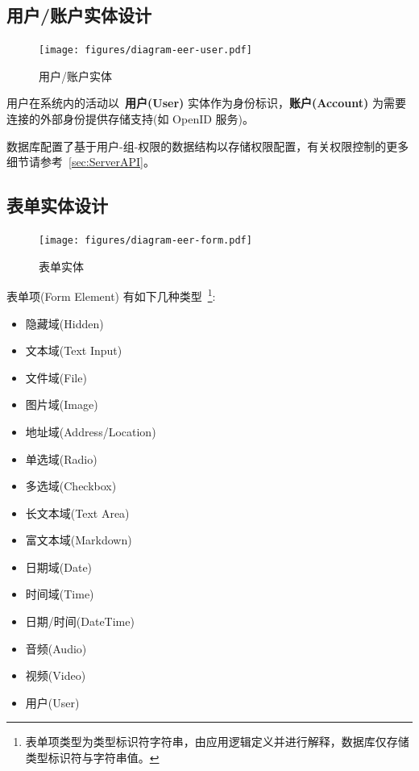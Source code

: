 \newpage

\subsection{用户/账户实体设计}

\begin{figure}[!h]
  \begin{center}
    \texttt{[image: figures/diagram-eer-user.pdf]}
    \caption{用户/账户实体\label{DatabaseEntityUser}}
  \end{center}
\end{figure}

用户在系统内的活动以~\textbf{用户(User)} 实体作为身份标识，\textbf{账户(Account)} 为需要连接的外部身份提供存储支持(如 OpenID 服务)。

数据库配置了基于用户-组-权限的数据结构以存储权限配置，有关权限控制的更多细节请参考~\ref{sec:ServerAPI}。

\newpage

\subsection{表单实体设计}

\begin{figure}[!h]
  \begin{center}
    \texttt{[image: figures/diagram-eer-form.pdf]}
    \caption{表单实体\label{DatabaseEntityForm}}
  \end{center}
\end{figure}

表单项(Form Element) 有如下几种类型~\footnote{表单项类型为类型标识符字符串，由应用逻辑定义并进行解释，数据库仅存储类型标识符与字符串值。}:

\begin{itemize}
  \item 隐藏域(Hidden)
  \item 文本域(Text Input)
  \item 文件域(File)
  \item 图片域(Image)
  \item 地址域(Address/Location)
  \item 单选域(Radio)
  \item 多选域(Checkbox)
  \item 长文本域(Text Area)
  \item 富文本域(Markdown)
  \item 日期域(Date)
  \item 时间域(Time)
  \item 日期/时间(DateTime)
  \item 音频(Audio)
  \item 视频(Video)
  \item 用户(User)
\end{itemize}


